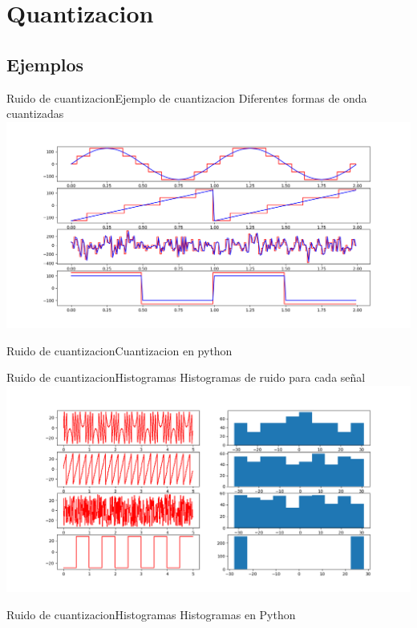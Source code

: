       \section{Quantizacion}
      \subsection{Ejemplos}
      \begin{frame}{Ruido de cuantizacion}{Ejemplo de cuantizacion}
         Diferentes formas de onda cuantizadas
         \center\includegraphics[width=1\textwidth]{1_clase/noise_examples}
         \vfill
      \end{frame}
      \begin{frame}{Ruido de cuantizacion}{Cuantizacion en python}
         \handsonicon
         
         \vfill
      \end{frame}
      \begin{frame}{Ruido de cuantizacion}{Histogramas}
         Histogramas de ruido para cada señal
         \center\includegraphics[width=1\textwidth]{1_clase/noise_histogram}
         \vfill
      \end{frame}
      \begin{frame}{Ruido de cuantizacion}{Histogramas}
         Histogramas en Python
         \handsonicon
         
         \vfill
      \end{frame}
